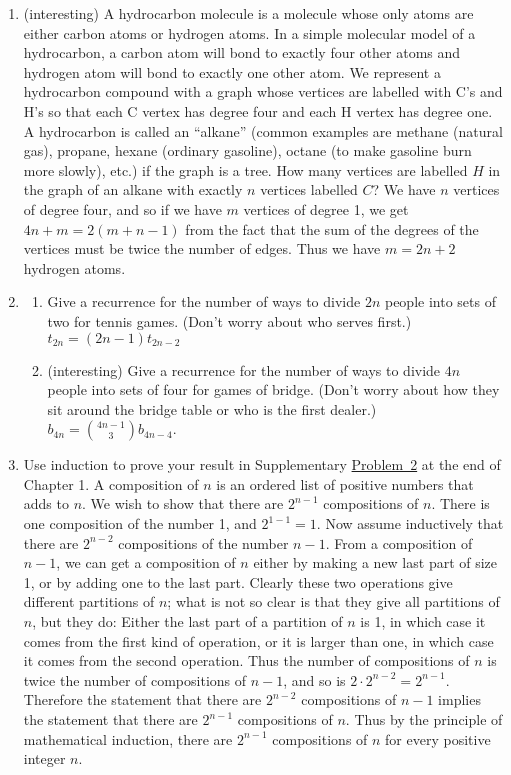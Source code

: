 \documentclass[10pt,]{book}
\theoremstyle{plain}
\theoremstyle{definition}
\numberwithin{equation}{chapter}
\begin{document}
\begin{enumerate}
\bigcup_{i=1}^nA\cap S_i\) holds for all positive integers \(n\).%
%
\item\hypertarget{li-40}{}(interesting) A hydrocarbon molecule is a molecule whose only atoms are either carbon atoms or hydrogen atoms.  In a simple molecular model of a hydrocarbon, a carbon atom will bond to exactly four other atoms and hydrogen atom will bond to exactly one other atom.  We represent a hydrocarbon compound with a graph whose vertices are labelled with C's and H's so that each C vertex has degree four and each H vertex has degree one.  A hydrocarbon is called an ``alkane'' (common examples are methane (natural gas), propane, hexane (ordinary gasoline), octane (to make gasoline burn more slowly), etc.) if the graph is a tree.  How many vertices are labelled \(H\) in the graph of an alkane with exactly \(n\) vertices labelled \(C\)? We have \(n\) vertices of degree four, and so if we have \(m\) vertices of degree 1, we get \(4n+m=2(m+n-1)\) from the fact that the sum of the degrees of the vertices must be twice the number of edges. Thus we have \(m=2n+2\) hydrogen atoms.%
%
\item\hypertarget{li-41}{}%
\begin{enumerate}
\item\hypertarget{li-42}{}Give a recurrence for the number of ways to divide \(2n\) people into sets of two for tennis games.  (Don't worry about who serves first.) \(t_{2n}=(2n-1)t_{2n-2}\)%
%
\item\hypertarget{li-43}{}(interesting) Give a recurrence for the number of ways to divide \(4n\) people into sets of four for games of bridge.  (Don't worry about how they sit around the bridge table or who is the first dealer.) \(b_{4n}=\binom{4n-1}{3}b_{4n-4}\).%
%
\end{enumerate}
%
\item\hypertarget{li-44}{}Use induction to prove your result in Supplementary \hyperlink{composition_numberof}{Problem~2} at the end of Chapter 1. A composition of \(n\) is an ordered list of positive numbers that adds to \(n\). We wish to show that there are \(2^{n-1}\) compositions of \(n\). There is one composition of the number 1, and \(2^{1-1}=1\). Now assume inductively that there are \(2^{n-2}\) compositions of the number \({n-1}\). From a composition of \(n-1\), we can get a composition of \(n\) either by making a new last part of size 1, or by adding one to the last part. Clearly these two operations give different partitions of \(n\); what is not so clear is that they give all partitions of \(n\), but they do: Either the last part of a partition of \(n\) is 1, in which case it comes from the first kind of operation, or it is larger than one, in which case it comes from the second operation. Thus the number of compositions of \(n\) is twice the number of compositions of \(n-1\), and so is \(2\cdot2^{n-2}=2^{n-1}\). Therefore the statement that there are \(2^{n-2}\) compositions of \(n-1\) implies the statement that there are \(2^{n-1}\) compositions of \(n\). Thus by the principle of mathematical induction, there are \(2^{n-1}\) compositions of \(n\) for every positive integer \(n\).%

\end{enumerate}
\end{document}
